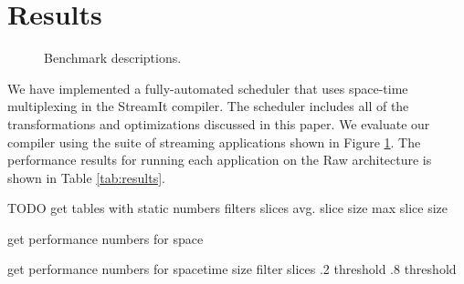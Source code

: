 \section{Results}
\label{sec:results}

\begin{figure}
\centering
{}
\caption{Benchmark descriptions.\protect\label{fig:benchmarks}}
\end{figure}

We have implemented a fully-automated scheduler that uses space-time
multiplexing in the StreamIt compiler.  The scheduler includes all of
the transformations and optimizations discussed in this paper.  We
evaluate our compiler using the suite of streaming applications shown
in Figure \ref{fig:benchmarks}.  The performance results for running
each application on the Raw architecture is shown in Table
\ref{tab:results}.


TODO
get tables with static numbers
	filters
	slices
	avg. slice size
	max slice size

get performance numbers for space

get performance numbers for spacetime 
	size filter slices
	.2 threshold
	.8 threshold
